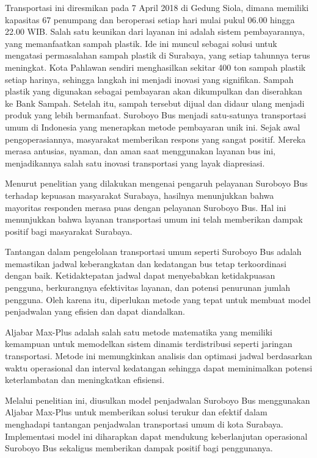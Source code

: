 \documentclass{file/TA-ITS}
\theoremstyle{definition}
\theoremstyle{definition}
\theoremstyle{plain}
\begin{document}
Transportasi ini diresmikan pada 7 April 2018 di Gedung Siola, dimana memiliki kapasitas 67 penumpang dan beroperasi setiap hari mulai pukul 06.00 hingga 22.00 WIB. Salah satu keunikan dari layanan ini adalah sistem pembayarannya, yang memanfaatkan sampah plastik. Ide ini muncul sebagai solusi untuk mengatasi permasalahan sampah plastik di Surabaya, yang setiap tahunnya terus meningkat. Kota Pahlawan sendiri menghasilkan sekitar 400 ton sampah plastik setiap harinya, sehingga langkah ini menjadi inovasi yang signifikan. Sampah plastik yang digunakan sebagai pembayaran akan dikumpulkan dan diserahkan ke Bank Sampah. Setelah itu, sampah tersebut dijual dan didaur ulang menjadi produk yang lebih bermanfaat. Suroboyo Bus menjadi satu-satunya transportasi umum di Indonesia yang menerapkan metode pembayaran unik ini. Sejak awal pengoperasiannya, masyarakat memberikan respons yang sangat positif. Mereka merasa antusias, nyaman, dan aman saat menggunakan layanan bus ini, menjadikannya salah satu inovasi transportasi yang layak diapresiasi.\cite{kusuma2020suroboyobusUU}

Menurut penelitian yang dilakukan \citeauthor{primadhanny2023pengaruhsuroboyobus} mengenai pengaruh pelayanan Suroboyo Bus terhadap kepuasan masyarakat Surabaya, hasilnya menunjukkan bahwa mayoritas responden merasa puas dengan pelayanan Suroboyo Bus. Hal ini menunjukkan bahwa layanan transportasi umum ini telah memberikan dampak positif bagi masyarakat Surabaya.

Tantangan dalam pengelolaan transportasi umum seperti Suroboyo Bus adalah memastikan jadwal keberangkatan dan kedatangan bus tetap terkoordinasi dengan baik. Ketidaktepatan jadwal dapat menyebabkan ketidakpuasan pengguna, berkurangnya efektivitas layanan, dan potensi penurunan jumlah pengguna. Oleh karena itu, diperlukan metode yang tepat untuk membuat model penjadwalan yang efisien dan dapat diandalkan.

Aljabar Max-Plus adalah salah satu metode matematika yang memiliki kemampuan untuk memodelkan sistem dinamis terdistribusi seperti jaringan transportasi. Metode ini memungkinkan analisis dan optimasi jadwal berdasarkan waktu operasional dan interval kedatangan sehingga dapat meminimalkan potensi keterlambatan dan meningkatkan efisiensi.

Melalui penelitian ini, diusulkan model penjadwalan Suroboyo Bus menggunakan Aljabar Max-Plus untuk memberikan solusi terukur dan efektif dalam menghadapi tantangan penjadwalan transportasi umum di kota Surabaya. Implementasi model ini diharapkan dapat mendukung keberlanjutan operasional Suroboyo Bus sekaligus memberikan dampak positif bagi penggunanya.
\end{document}
